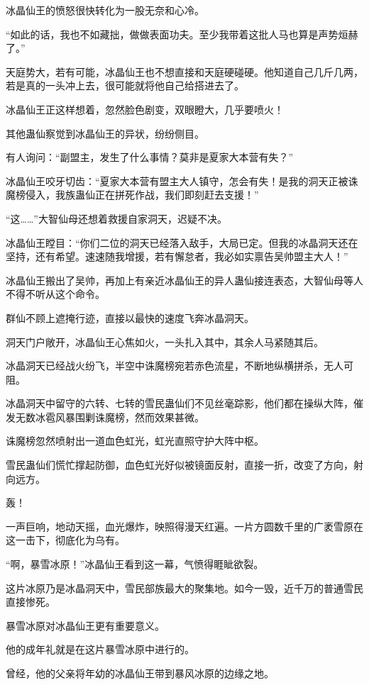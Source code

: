 \begin{this_body}
冰晶仙王的愤怒很快转化为一股无奈和心冷。

“如此的话，我也不如藏拙，做做表面功夫。至少我带着这批人马也算是声势烜赫了。”

天庭势大，若有可能，冰晶仙王也不想直接和天庭硬碰硬。他知道自己几斤几两，若是真的一头冲上去，很可能就将他自己给搭进去了。

冰晶仙王正这样想着，忽然脸色剧变，双眼瞪大，几乎要喷火！

其他蛊仙察觉到冰晶仙王的异状，纷纷侧目。

有人询问：“副盟主，发生了什么事情？莫非是夏家大本营有失？”

冰晶仙王咬牙切齿：“夏家大本营有盟主大人镇守，怎会有失！是我的洞天正被诛魔榜侵入，我族蛊仙正在拼死作战，我们即刻赶去支援！”

“这……”大智仙母还想着救援自家洞天，迟疑不决。

冰晶仙王瞠目：“你们二位的洞天已经落入敌手，大局已定。但我的冰晶洞天还在坚持，还有希望。速速随我增援，若有懈怠者，我必如实禀告吴帅盟主大人！”

冰晶仙王搬出了吴帅，再加上有亲近冰晶仙王的异人蛊仙接连表态，大智仙母等人不得不听从这个命令。

群仙不顾上遮掩行迹，直接以最快的速度飞奔冰晶洞天。

洞天门户敞开，冰晶仙王心焦如火，一头扎入其中，其余人马紧随其后。

冰晶洞天已经战火纷飞，半空中诛魔榜宛若赤色流星，不断地纵横拼杀，无人可阻。

冰晶洞天中留守的六转、七转的雪民蛊仙们不见丝毫踪影，他们都在操纵大阵，催发无数冰雹风暴围剿诛魔榜，然而效果甚微。

诛魔榜忽然喷射出一道血色虹光，虹光直照守护大阵中枢。

雪民蛊仙们慌忙撑起防御，血色虹光好似被镜面反射，直接一折，改变了方向，射向远方。

轰！

一声巨响，地动天摇，血光爆炸，映照得漫天红遍。一片方圆数千里的广袤雪原在这一击下，彻底化为乌有。

“啊，暴雪冰原！”冰晶仙王看到这一幕，气愤得睚眦欲裂。

这片冰原乃是冰晶洞天中，雪民部族最大的聚集地。如今一毁，近千万的普通雪民直接惨死。

暴雪冰原对冰晶仙王更有重要意义。

他的成年礼就是在这片暴雪冰原中进行的。

曾经，他的父亲将年幼的冰晶仙王带到暴风冰原的边缘之地。


\end{this_body}
